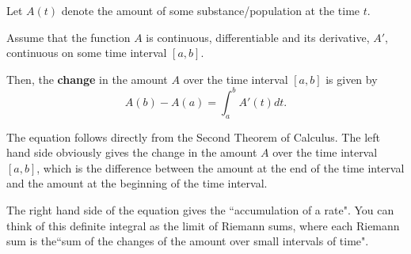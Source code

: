 \documentclass{ximera}
\begin{document}
\begin{theorem}\hfill

Let  $A(t)$ denote the amount of some substance/population at the time $t$.

 Assume that the function $A$ is continuous, differentiable and its derivative, $A'$, continuous on some time interval $[a,b]$.
 
 
Then, the \textbf{change} in the amount $A$ over the time interval $[a,b]$ is given by
\[
A(b)-A(a)=\int_a^bA'(t)dt.
\]
\end{theorem}
\begin {explanation}
The equation follows directly from the Second Theorem of Calculus. 
The left hand side obviously gives the change in the amount $A$ over the time interval $[a,b]$, which is the difference between the amount at the end of the time interval and the amount at the beginning of the time interval. 

The right hand side of the equation gives the ``accumulation of a rate".
You can think of this definite integral as the limit of Riemann sums, where each Riemann sum is the``sum of  the changes of the amount over small intervals of time".
\end {explanation}
\end{document}
